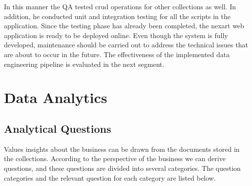 \documentclass[a4Paper,12pt]{report}
\begin{document}
In this manner the QA tested crud operations for other collections as well. In addition, he conducted unit and integration testing for all the scripts in the application. Since the testing phase has already been completed, the nexart web application is ready to be deployed online. Even though the system is fully developed, maintenance should be carried out to address the technical issues that are about to occur in the future. The effectiveness of the implemented data engineering pipeline is evaluated in the next segment.
\chapter{Data Analytics}
\section{Analytical Questions}
Values insights about the business can be drawn from the documents stored in the collections. According to the perspective of the business we can derive questions, and these questions are divided into several categories. The question categories and the relevant question for each category are listed below.
\end{document}
